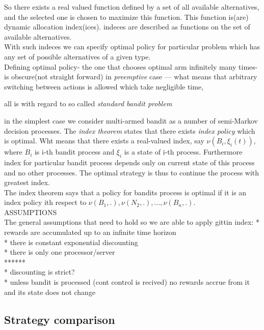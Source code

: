 \documentclass[12pt, a4paper, pdflatex, leqno]{report}
\begin{document}
So there exists a real valued function defined by a set of all available alternatives, and the selected one is chosen to maximize this function. This function is(are) dynamic allocation index(ices). indeces are described as functions on the set of available alternatives.\\
With such indeces we can specify optimal policy for particular problem which has any set of possible alternatives of a given type.\\

Defining optimal policy- the one that chooses optimal arm infinitely many times- is obscure(not straight forward) in \emph{preemptive} case --- what means that arbitrary switching between actions is allowed which take negligible time, 

all is with regard to so called \emph{standard bandit problem}

in the simplest case we consider multi-armed bandit as a number of semi-Markov decision processes. The \emph{index theorem} states that there exists \emph{index policy} which is optimal. Wht means that there exists a real-valued index, say $\nu ( B_i , \xi_i(t) )$, where $B_i$ is i-th bandit process and $\xi_i$ is a state of i-th process. Furthermore index for particular bandit process depends only on current state of this process and no other processes. The optimal strategy is thus to continue the process with greatest index.\\

The index theorem says that a policy for bandits process is optimal if it is an index policy ith respect to $\nu(B_1, .), \nu(N_2, .), ... , \nu(B_n, .)$.\\


ASSUMPTIONS\\
The general assumptions that need to hold so we are able to apply gittin index:
* rewards are accumulated up to an infinite time horizon\\
* there is constant exponential discounting\\
* there is only one processor/server\\
******\\
* discounting is strict?\\
* unless bandit is processed (cont control is recived) no rewards accrue from it and its state does not change\\


\subsection{Strategy comparison}
\end{document}
